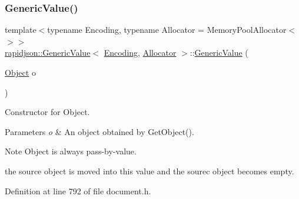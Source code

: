 \subsubsection{\texorpdfstring{GenericValue()}{GenericValue()}\hspace{0.1cm}{\footnotesize\ttfamily [17/17]}}
{\footnotesize\ttfamily template$<$typename Encoding, typename Allocator = Memory\+Pool\+Allocator$<$$>$$>$ \\
\mbox{\hyperlink{classrapidjson_1_1_generic_value}{rapidjson\+::\+Generic\+Value}}$<$ \mbox{\hyperlink{classrapidjson_1_1_encoding}{Encoding}}, \mbox{\hyperlink{classrapidjson_1_1_allocator}{Allocator}} $>$\+::\mbox{\hyperlink{classrapidjson_1_1_generic_value}{Generic\+Value}} (\begin{DoxyParamCaption}\item[{\mbox{\hyperlink{classrapidjson_1_1_generic_value_ae1b1a60a9c69ce5ac48b8c445e3e9231}{Object}}}]{o }\end{DoxyParamCaption})}



Constructor for Object. 


\begin{DoxyParams}{Parameters}
{\em o} & An object obtained by {\ttfamily Get\+Object()}. \\
\hline
\end{DoxyParams}
\begin{DoxyNote}{Note}
{\ttfamily Object} is always pass-\/by-\/value. 

the source object is moved into this value and the sourec object becomes empty. 
\end{DoxyNote}


Definition at line 792 of file document.\+h.


\begin{DoxyCode}{0}

\end{DoxyCode}
\mbox{\label{classrapidjson_1_1_generic_value_a433a64b466c80cadf7d1acaa6f065437}} 
